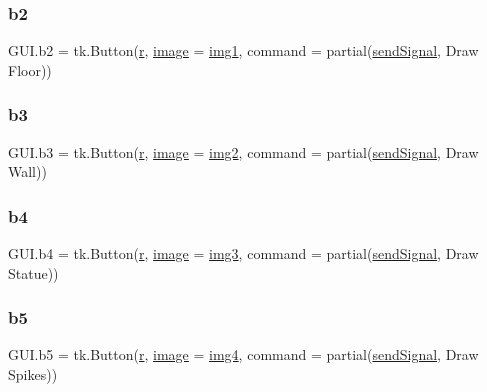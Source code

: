 \subsubsection{\texorpdfstring{b2}{b2}}
{\footnotesize\ttfamily G\+U\+I.\+b2 = tk.\+Button(\mbox{\hyperlink{_s_d_l__opengl_8h_a42ce7cdc612e53abee15043f80220d97}{r}}, \mbox{\hyperlink{_s_d_l__opengl_8h_a0a221b005894579fea3b9eb7bfc2ee71}{image}} = \mbox{\hyperlink{namespace_g_u_i_a2b9af2e6ceeadebce40ff8171633d86c}{img1}}, command = partial(\mbox{\hyperlink{namespace_g_u_i_ae82f740e6453cdd542b52ede1560c2c3}{send\+Signal}}, \textquotesingle{}Draw Floor\textquotesingle{}))}

\mbox{\label{namespace_g_u_i_ae03019b48b46235fcf9eb1ae963fd68e}} 
\subsubsection{\texorpdfstring{b3}{b3}}
{\footnotesize\ttfamily G\+U\+I.\+b3 = tk.\+Button(\mbox{\hyperlink{_s_d_l__opengl_8h_a42ce7cdc612e53abee15043f80220d97}{r}}, \mbox{\hyperlink{_s_d_l__opengl_8h_a0a221b005894579fea3b9eb7bfc2ee71}{image}} = \mbox{\hyperlink{namespace_g_u_i_a49cad6894844031f41a996947032a4a4}{img2}}, command = partial(\mbox{\hyperlink{namespace_g_u_i_ae82f740e6453cdd542b52ede1560c2c3}{send\+Signal}}, \textquotesingle{}Draw Wall\textquotesingle{}))}

\mbox{\label{namespace_g_u_i_a4e69ff82719fbda902c3b2126e79d692}} 
\subsubsection{\texorpdfstring{b4}{b4}}
{\footnotesize\ttfamily G\+U\+I.\+b4 = tk.\+Button(\mbox{\hyperlink{_s_d_l__opengl_8h_a42ce7cdc612e53abee15043f80220d97}{r}}, \mbox{\hyperlink{_s_d_l__opengl_8h_a0a221b005894579fea3b9eb7bfc2ee71}{image}} = \mbox{\hyperlink{namespace_g_u_i_a06adcfe75921645a1ef64cf7a4cdb3fd}{img3}}, command = partial(\mbox{\hyperlink{namespace_g_u_i_ae82f740e6453cdd542b52ede1560c2c3}{send\+Signal}}, \textquotesingle{}Draw Statue\textquotesingle{}))}

\mbox{\label{namespace_g_u_i_ab78877371456f13f3765198ec7ee8d91}} 
\subsubsection{\texorpdfstring{b5}{b5}}
{\footnotesize\ttfamily G\+U\+I.\+b5 = tk.\+Button(\mbox{\hyperlink{_s_d_l__opengl_8h_a42ce7cdc612e53abee15043f80220d97}{r}}, \mbox{\hyperlink{_s_d_l__opengl_8h_a0a221b005894579fea3b9eb7bfc2ee71}{image}} = \mbox{\hyperlink{namespace_g_u_i_a63bec101ed0dcb5864839c78fcb02572}{img4}}, command = partial(\mbox{\hyperlink{namespace_g_u_i_ae82f740e6453cdd542b52ede1560c2c3}{send\+Signal}}, \textquotesingle{}Draw Spikes\textquotesingle{}))}

